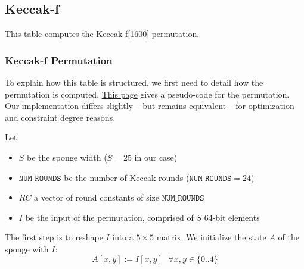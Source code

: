 \subsection{Keccak-f}
\label{keccak-f}

This table computes the Keccak-f[1600] permutation.

\subsubsection{Keccak-f Permutation}
To explain how this table is structured, we first need to detail how the permutation is computed. \href{https://keccak.team/keccak_specs_summary.html}{This page} gives a pseudo-code for the permutation. Our implementation differs slightly -- but remains equivalent -- for optimization and constraint degree reasons. 

Let:
\begin{itemize}
    \item $S$ be the sponge width ($S=25$ in our case)
    \item $\texttt{NUM\_ROUNDS}$ be the number of Keccak rounds ($\texttt{NUM\_ROUNDS} = 24$)
    \item $RC$ a vector of round constants of size  $\texttt{NUM\_ROUNDS}$
    \item $I$ be the input of the permutation, comprised of $S$ 64-bit elements
\end{itemize}    

The first step is to reshape $I$ into a $5 \times 5$ matrix. We initialize the state $A$ of the sponge with $I$: $$A[x, y] := I[x, y] \text{ }  \forall x, y \in \{0..4\}$$

